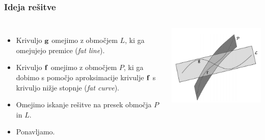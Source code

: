 \documentclass[unknownkeysallowed]{beamer}
\begin{document}
\begin{frame}
\frametitle{Ideja rešitve}
\begin{columns}[c]
	\begin{itemize}
		\item Krivuljo ${\bf g}$ omejimo z območjem $L$, ki ga omejujejo premice ({\em fat line}).
		\medskip
		\item Krivuljo ${\bf f}$ omejimo z območjem $P$, ki ga dobimo s pomočjo aproksimacije krivulje ${\bf f}$ s krivuljo nižje stopnje ({\em fat curve}).
		\medskip
		\item Omejimo iskanje rešitve na presek območja $P$ in $L$.
		\medskip
		\item Ponavljamo.
	\end{itemize}
	\includegraphics[width=0.9\linewidth,frame]{2}
\end{columns}
\end{frame}
\end{document}
